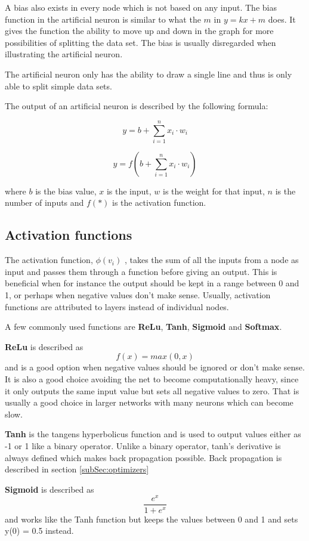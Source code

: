 A bias also exists in every node which is not based on any input. The bias function in the artificial neuron is similar to what the $m$ in $y = kx + m$ does. It gives the function the ability to move up and down in the graph for more possibilities of splitting the data set. The bias is usually disregarded when illustrating the artificial neuron.

The artificial neuron only has the ability to draw a single line and thus is only able to split simple data sets.

The output of an artificial neuron is described by the following formula:

\[ y = b + \displaystyle\sum_{i=1}^{n} x_i \cdot w_i \]

\[y=f(b+\sum_{i=1}^n x_i\cdot w_i)\]

where $b$ is the bias value, $x$ is the input, $w$ is the weight for that input, $n$ is the number of inputs and $f(*)$ is the activation function.

\subsection{Activation functions}
\label{subsec:activationfunctions}
The activation function,  $ \phi (v_{i}) $ , takes the sum of all the inputs from a node as input and passes them through a function before giving an output. This is beneficial when for instance the output should be kept in a range between 0 and 1, or perhaps when negative values don't make sense.
Usually, activation functions are attributed to layers instead of individual nodes.

A few commonly used functions are \textbf{ReLu}, \textbf{Tanh}, \textbf{Sigmoid} and \textbf{Softmax}.

\textbf{ReLu} is described as
\[f(x) = max(0, x)\]
and is a good option when negative values should be ignored or don't make sense. 
It is also a good choice avoiding the net to become computationally heavy,
since it only outputs the same input value but sets all negative values to zero.
That is usually a good choice in larger networks with many neurons which can become
slow.

\textbf{Tanh} is the tangens hyperbolicus function and is used to output values either as -1 or 1 like a binary operator. Unlike a binary operator, tanh's derivative is always defined which makes back propagation possible.
Back propagation is described in section \ref{subSec:optimizers}

\textbf{Sigmoid} is described as 
\[\frac{e^x}{1+e^x}\]
and works like the Tanh function but keeps the values between 0 and 1 and sets y(0) = 0.5 instead.


